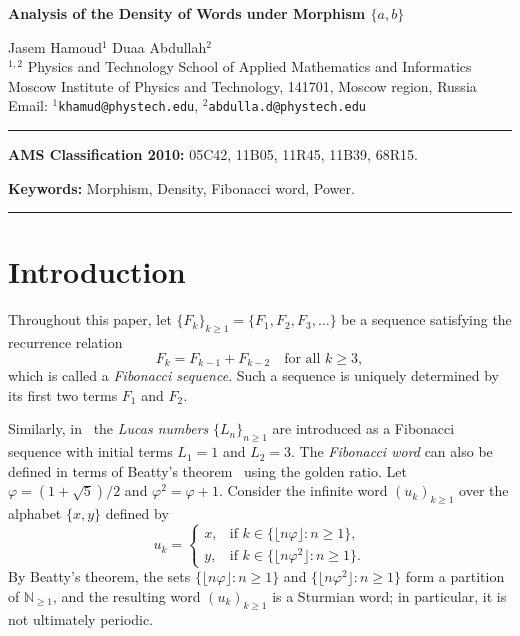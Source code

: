 \documentclass[12pt, a4paper]{article}
\begin{document}
\begin{center}
{\large \bf  Analysis of the Density of Words under Morphism $\{a,b\}$}
\end{center}
\begin{center}
 Jasem Hamoud$^1$ \hspace{0.2 cm}  Duaa Abdullah$^{2}$\\[6pt]
 $^{1,2}$ Physics and Technology School of Applied Mathematics and Informatics \\
Moscow Institute of Physics and Technology, 141701, Moscow region, Russia\\[6pt]
Email: 	 $^{1}${\tt khamud@phystech.edu},
 $^{2}${\tt abdulla.d@phystech.edu}
\end{center}
\noindent
\begin{abstract}
In this paper, we analyze the density of the  Fibonacci word and its derived forms by examining the morphisms associated with each. It offers a comparative analysis of the density of Fibonacci numbers alongside other words derived from Fibonacci word. Fibonacci words over the alphabet $\{a,b\}$, we define a novel \emph{power} operation that yields a formal linear combination in the free abelian group generated by all finite words.
\end{abstract}

\noindent\rule{12.2cm}{1.0pt}

\noindent\textbf{AMS Classification 2010:}  05C42, 11B05, 11R45, 11B39, 68R15.


\noindent\textbf{Keywords:} Morphism, Density, Fibonacci word, Power.

\noindent\rule{12.2cm}{1.0pt}

\section{Introduction}
Throughout this paper, let $\{F_k\}_{k \ge 1} = \{F_1, F_2, F_3, \ldots\}$ be a sequence satisfying the recurrence relation
\[
F_k = F_{k-1} + F_{k-2} \quad \text{for all } k \ge 3,
\]
which is called a \emph{Fibonacci sequence}. Such a sequence is uniquely determined by its first two terms $F_1$ and $F_2$.

Similarly, in~\cite{Rebman1975} the \emph{Lucas numbers} $\{L_n\}_{n \ge 1}$ are introduced as a Fibonacci sequence with initial terms $L_1 = 1$ and $L_2 = 3$. The \emph{Fibonacci word} can also be defined in terms of Beatty's theorem~\cite{Beatty1926} using the golden ratio. Let $\varphi = (1+\sqrt{5})/2$ and $\varphi^2 = \varphi + 1$. Consider the infinite word $(u_k)_{k \ge 1}$ over the alphabet $\{x,y\}$ defined by
\[
u_k =
\begin{cases}
x, & \text{if } k \in \{\lfloor n \varphi \rfloor : n \ge 1\},\\[2mm]
y, & \text{if } k \in \{\lfloor n \varphi^2 \rfloor : n \ge 1\}.
\end{cases}
\]
By Beatty's theorem, the sets $\{\lfloor n \varphi \rfloor : n \ge 1\}$ and $\{\lfloor n \varphi^2 \rfloor : n \ge 1\}$ form a partition of $\mathbb{N}_{\ge 1}$, and the resulting word $(u_k)_{k \ge 1}$ is a Sturmian word; in particular, it is not ultimately periodic.
\end{document}
